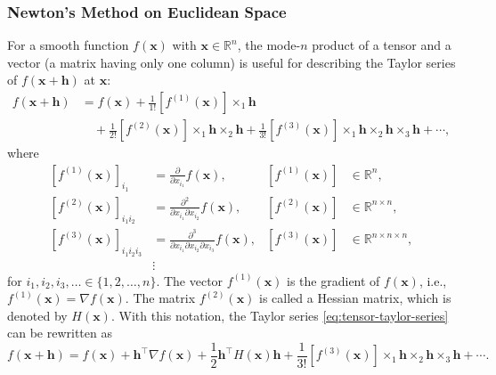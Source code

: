 \subsubsection{{Newton's Method on Euclidean Space}}\label{subsec:euclidean-newton}
{For a smooth function $f(\boldsymbol{x})$ with $\boldsymbol{x}\in\mathbb{R}^n$, the mode-$n$ product of a tensor and a vector (a matrix having only one column) is useful for describing the Taylor series of $f(\boldsymbol{x}+\boldsymbol{h})$ at $\boldsymbol{x}$:}
\begin{align}
f(\boldsymbol{x}+\boldsymbol{h})&=f(\boldsymbol{x})+\frac1{1!}[f^{(1)}(\boldsymbol{x})]\times_1\boldsymbol{h}\label{eq:tensor-taylor-first-line}\\
&\quad+\frac1{2!}[f^{(2)}(\boldsymbol{x})]\times_1\boldsymbol{h}\times_2\boldsymbol{h}+\frac1{3!}[f^{(3)}(\boldsymbol{x})]\times_1\boldsymbol{h}\times_2\boldsymbol{h}\times_3\boldsymbol{h}+\cdots,\label{eq:tensor-taylor-series}
\end{align}
{where}
\[\begin{aligned}
[f^{(1)}(\boldsymbol{x})]_{i_1}&=\frac{\partial}{\partial x_{i_1}}f(\boldsymbol{x}),&[f^{(1)}(\boldsymbol{x})]&\in\mathbb{R}^n,\\
[f^{(2)}(\boldsymbol{x})]_{i_1i_2}&=\frac{\partial^2}{\partial x_{i_1}\partial x_{i_2}}f(\boldsymbol{x}),&[f^{(2)}(\boldsymbol{x})]&\in\mathbb{R}^{n\times n},\\
[f^{(3)}(\boldsymbol{x})]_{i_1i_2i_3}&=\frac{\partial^3}{\partial x_{i_1}\partial x_{i_2}\partial x_{i_3}}f(\boldsymbol{x}),&[f^{(3)}(\boldsymbol{x})]&\in\mathbb{R}^{n\times n\times n},\\
&\vdots
\end{aligned}\]
{for $i_1,i_2,i_3,\ldots\in\{1,2,\ldots,n\}$. The vector $f^{(1)}(\boldsymbol{x})$ is the gradient of $f(\boldsymbol{x})$, i.e., $f^{(1)}(\boldsymbol{x})=\nabla f(\boldsymbol{x})$. The matrix $f^{(2)}(\boldsymbol{x})$ is called a Hessian matrix, which is denoted by $H(\boldsymbol{x})$. With this notation, the Taylor series \eqref{eq:tensor-taylor-series} can be rewritten as}
\begin{equation}\label{eq:gradient-hessian-taylor-series}
f(\boldsymbol{x}+\boldsymbol{h})=f(\boldsymbol{x})+\boldsymbol{h}^{\top}\nabla f(\boldsymbol{x})+\frac12\boldsymbol{h}^{\top}H(\boldsymbol{x})\boldsymbol{h}+\frac1{3!}[f^{(3)}(\boldsymbol{x})]\times_1\boldsymbol{h}\times_2\boldsymbol{h}\times_3\boldsymbol{h}+\cdots.
\end{equation}
